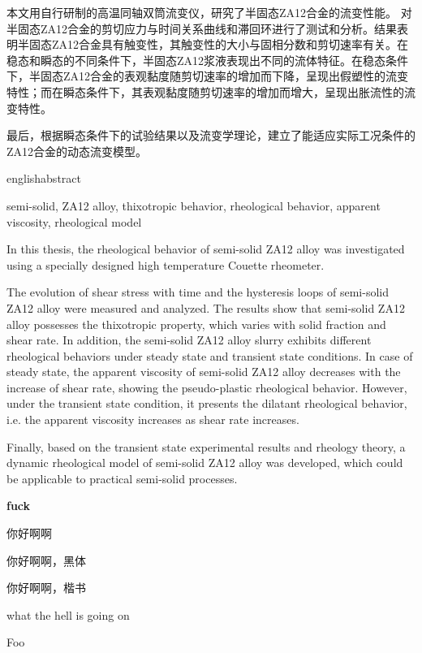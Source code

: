 \documentclass[a4paper, 12pt]{article}
\renewenvironment{abstract}[1]
\newenvironment{englishabstract}[1]
{

\phantomsection
\addcontentsline{toc}{chapter}{Abstract}

\vspace*{12pt}
\begin{center}
Abstract
\end{center}

{\textbf KEY WORDS：} #1
}
\begin{document}





\begin{abstract}{半固态，ZA12合金，触变性能，流变性能，表观黏度，流变模型}

{
\par 本文用自行研制的高温同轴双筒流变仪，研究了半固态ZA12合金的流变性能。
对半固态ZA12合金的剪切应力与时间关系曲线和滞回环进行了测试和分析。结果表明半固态ZA12合金具有触变性，其触变性的大小与固相分数和剪切速率有关。在稳态和瞬态的不同条件下，半固态ZA12浆液表现出不同的流体特征。在稳态条件下，半固态ZA12合金的表观黏度随剪切速率的增加而下降，呈现出假塑性的流变特性；而在瞬态条件下，其表观黏度随剪切速率的增加而增大，呈现出胀流性的流变特性。
\par 最后，根据瞬态条件下的试验结果以及流变学理论，建立了能适应实际工况条件的ZA12合金的动态流变模型。\newline

}
\end{abstract}

\newpage

\begin{englishabstract}{semi-solid, ZA12 alloy, thixotropic behavior, rheological behavior, apparent viscosity, rheological model}

\par In this thesis, the rheological behavior of semi-solid ZA12 alloy was investigated using a specially designed high temperature Couette rheometer.
\par The evolution of shear stress with time and the hysteresis loops of semi-solid ZA12 alloy were measured and analyzed. The results show that semi-solid ZA12 alloy possesses the thixotropic property, which varies with solid fraction and shear rate. In addition, the semi-solid ZA12 alloy slurry exhibits different rheological behaviors under steady state and transient state conditions. In case of steady state, the apparent viscosity of semi-solid ZA12 alloy decreases with the increase of shear rate, showing the pseudo-plastic rheological behavior. However, under the transient state condition, it presents the dilatant rheological behavior, i.e. the apparent viscosity increases as shear rate increases.
\par Finally, based on the transient state experimental results and rheology theory, a dynamic rheological model of semi-solid ZA12 alloy was developed, which could be applicable to practical semi-solid processes.\newline

\end{englishabstract}
\newpage

\vspace*{36pt}
\tableofcontents

\newpage
\vspace{5cm}

\textbf{fuck}

\bigskip
你好啊啊

{\heiti 你好啊啊，黑体}

{\kaishu 你好啊啊，楷书}


what the hell is going on 

{\fontsize{50}{60}\selectfont Foo}
\end{document}
